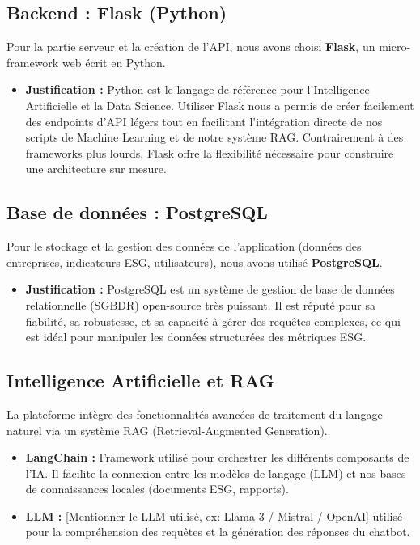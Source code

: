 \subsection{Backend : Flask (Python)}
Pour la partie serveur et la création de l'API, nous avons choisi \textbf{Flask}, un micro-framework web écrit en Python.
\begin{itemize}
    \item \textbf{Justification :} Python est le langage de référence pour l'Intelligence Artificielle et la Data Science. Utiliser Flask nous a permis de créer facilement des endpoints d'API légers tout en facilitant l'intégration directe de nos scripts de Machine Learning et de notre système RAG. Contrairement à des frameworks plus lourds, Flask offre la flexibilité nécessaire pour construire une architecture sur mesure.
\end{itemize}

\subsection{Base de données : PostgreSQL}
Pour le stockage et la gestion des données de l'application (données des entreprises, indicateurs ESG, utilisateurs), nous avons utilisé \textbf{PostgreSQL}.
\begin{itemize}
    \item \textbf{Justification :} PostgreSQL est un système de gestion de base de données relationnelle (SGBDR) open-source très puissant. Il est réputé pour sa fiabilité, sa robustesse, et sa capacité à gérer des requêtes complexes, ce qui est idéal pour manipuler les données structurées des métriques ESG.
\end{itemize}

\subsection{Intelligence Artificielle et RAG}
La plateforme intègre des fonctionnalités avancées de traitement du langage naturel via un système RAG (Retrieval-Augmented Generation).
\begin{itemize}
    \item \textbf{LangChain :} Framework utilisé pour orchestrer les différents composants de l'IA. Il facilite la connexion entre les modèles de langage (LLM) et nos bases de connaissances locales (documents ESG, rapports).
    \item \textbf{LLM :} [Mentionner le LLM utilisé, ex: Llama 3 / Mistral / OpenAI] utilisé pour la compréhension des requêtes et la génération des réponses du chatbot.
\end{itemize}

